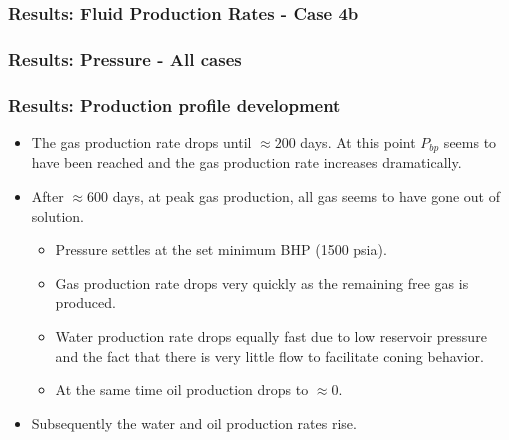 

\begin{frame}
    \frametitle{Results: Fluid Production Rates - Case 4b}
    \centerline{}
\end{frame}

\begin{frame}
    \frametitle{Results: Pressure - All cases}
    \centerline{}
\end{frame}

\begin{frame}
    \frametitle{Results: Production profile development}
    \begin{itemize}
        \item The gas production rate drops until $\approx 200$ days. At this point $P_{bp}$ seems to have been reached and the gas production rate increases dramatically.
        \pause
        \item After $\approx 600$ days, at peak gas production, all gas seems to have gone out of solution.
        \begin{itemize}
            \item Pressure settles at the set minimum BHP (1500 psia).
            \item Gas production rate drops very quickly as the remaining free gas is produced.
            \item Water production rate drops equally fast due to low reservoir pressure and the fact that there is very little flow to facilitate coning behavior.
            \item At the same time oil production drops to $\approx 0$.
        \end{itemize}
        \pause
        \item Subsequently the water and oil production rates rise.
    \end{itemize}
\end{frame}

